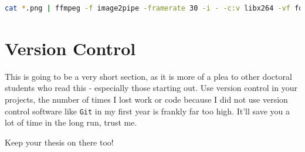 \begin{lstlisting}[language=bash]
cat *.png | ffmpeg -f image2pipe -framerate 30 -i - -c:v libx264 -vf format=yuv420p output.mp4
\end{lstlisting}

\section{Version Control}

This is going to be a very short section, as it is more of a plea to other doctoral students who read this - especially those starting out.
Use version control in your projects, the number of times I lost work or code because I did not use version control software like \texttt{Git} in my first year is frankly far too high.
It'll save you a lot of time in the long run, trust me.

\begin{center}
  Keep your thesis on there too!
\end{center}